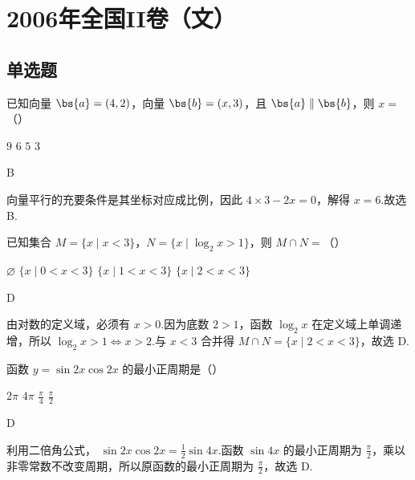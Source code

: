 \chapter{2006年全国II卷（文）}
\section{单选题}
\begin{problem}
已知向量 \(\bs{a} = (4, 2)\)，向量 \(\bs{b} = (x, 3)\)，且 \(\bs{a} \parallel \bs{b}\)，则 \(x =\)（\quad）

\choices
    {\(9\)}
    {\(6\)}
    {\(5\)}
    {\(3\)}
\end{problem}

\begin{answer}
B
\end{answer}

\begin{solution}
向量平行的充要条件是其坐标对应成比例，因此
\(4\times3-2x=0\)，解得 \(x=6\).故选 B.
\end{solution}

\begin{problem}
已知集合 \( M = \{x \mid x < 3\} \)，\( N = \{x \mid \log_2 x > 1\} \)，则 \( M \cap N = \)（\quad）

\choices
    {\( \varnothing \)}
    {\(\{x \mid 0 < x < 3\}\)}
    {\( \{x \mid 1 < x < 3\} \)}
    {\(\{x\mid 2 < x < 3\}\)}
\end{problem}

\begin{answer}
D
\end{answer}

\begin{solution}
由对数的定义域，必须有 \(x>0\).因为底数 \(2>1\)，函数 \(\log_{2}x\) 在定义域上单调递增，所以
\(\log_{2}x>1\iff x>2\).与 \(x<3\) 合并得
\(M\cap N=\{x\mid2<x<3\}\)，故选 D.
\end{solution}

\begin{problem}
函数 \( y = \sin 2x \cos 2x \) 的最小正周期是（\quad）

\choices
    {\(2\pi\)}
    {\(4\pi\)}
    {\( \frac{\pi}{4} \)}
    {\(\frac{\pi}{2}\)}
\end{problem}

\begin{answer}
D
\end{answer}

\begin{solution}
利用二倍角公式，
\(\sin2x\cos2x=\frac12\sin4x\).函数 \(\sin4x\) 的最小正周期为 \(\frac{\pi}{2}\)，乘以非零常数不改变周期，所以原函数的最小正周期为 \(\frac{\pi}{2}\)，故选 D.
\end{solution}

